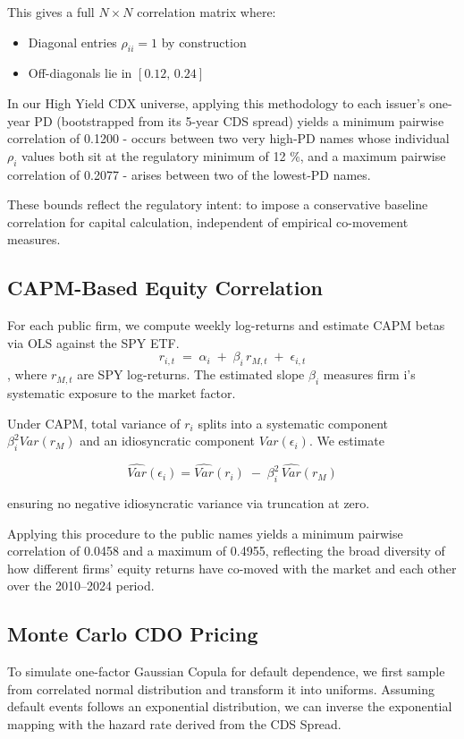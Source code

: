 \documentclass[
	a4paper,         %
	12pt,            %
	unnumberedsections,  %
	twoside,         %
]{LTJournalArticle}
\begin{document}
This gives a full $N\times N$ correlation matrix where:
\begin{itemize}
    \item Diagonal entries $\rho_{ii}=1$ by construction
    \item Off-diagonals lie in $[0.12,\,0.24]$
\end{itemize}

In our High Yield CDX universe, applying this methodology to each issuer’s one-year PD (bootstrapped from its 5-year CDS spread) yields a minimum pairwise correlation of 0.1200 - occurs between two very high‐PD names whose individual $\rho_i$ values both sit at the regulatory minimum of 12 \%, and a maximum pairwise correlation of 0.2077 - arises between two of the lowest‐PD names.

These bounds reflect the regulatory intent: to impose a conservative baseline correlation for capital calculation, independent of empirical co-movement measures.

\subsection{CAPM-Based Equity Correlation}
For each public firm, we compute weekly log-returns and estimate CAPM betas via OLS against the SPY ETF. 
$$r_{i,t} \;=\;\alpha_i \;+\;\beta_i\,r_{M,t}\;+\;\epsilon_{i,t}$$,
where $r_{M,t}$ are SPY log-returns.  The estimated slope $\beta_i$ measures firm i’s systematic exposure to the market factor.

Under CAPM, total variance of $r_{i}$ splits into a systematic component $\beta_i^2 Var(r_M)$ and an idiosyncratic component $Var(\epsilon_i)$.  We estimate

$$\widehat{Var}(\epsilon_i)
= \widehat{Var}(r_i) \;-\; \beta_i^2\,\widehat{Var}(r_M)$$

ensuring no negative idiosyncratic variance via truncation at zero.

Applying this procedure to the public names yields a minimum pairwise correlation of 0.0458 and a maximum of 0.4955, reflecting the broad diversity of how different firms’ equity returns have co-moved with the market and each other over the 2010–2024 period.

\subsection{Monte Carlo CDO Pricing}

To simulate one-factor Gaussian Copula for default dependence, we first sample from correlated normal distribution and transform it into uniforms. Assuming default events follows an exponential distribution, we can inverse the exponential mapping with the hazard rate derived from the CDS Spread. 
\end{document}
